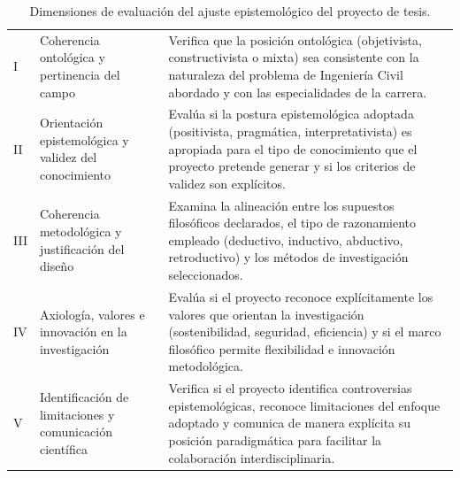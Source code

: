 \begin{table}[htbp]
\centering
\scriptsize
\caption{Dimensiones de evaluación del ajuste epistemológico del proyecto de tesis.}
\label{tab:dim-epistemologica}
\begin{tabularx}{\textwidth}{|C{0.8cm}|L{4.5cm}|X|}
\hline
{}
 &  &  \\ \hline
I & Coherencia ontológica y pertinencia del campo & Verifica que la posición ontológica (objetivista, constructivista o mixta) sea consistente con la naturaleza del problema de Ingeniería Civil abordado y con las especialidades de la carrera. \\ \hline
{}
II & Orientación epistemológica y validez del conocimiento & Evalúa si la postura epistemológica adoptada (positivista, pragmática, interpretativista) es apropiada para el tipo de conocimiento que el proyecto pretende generar y si los criterios de validez son explícitos. \\ \hline
III & Coherencia metodológica y justificación del diseño & Examina la alineación entre los supuestos filosóficos declarados, el tipo de razonamiento empleado (deductivo, inductivo, abductivo, retroductivo) y los métodos de investigación seleccionados. \\ \hline
{}
IV & Axiología, valores e innovación en la investigación & Evalúa si el proyecto reconoce explícitamente los valores que orientan la investigación (sostenibilidad, seguridad, eficiencia) y si el marco filosófico permite flexibilidad e innovación metodológica. \\ \hline
V & Identificación de limitaciones y comunicación científica & Verifica si el proyecto identifica controversias epistemológicas, reconoce limitaciones del enfoque adoptado y comunica de manera explícita su posición paradigmática para facilitar la colaboración interdisciplinaria. \\ \hline
\end{tabularx}
\end{table}

